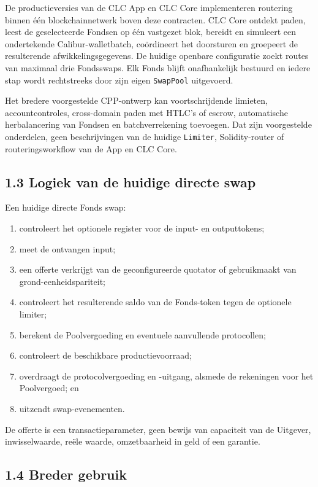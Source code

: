 \documentclass[11pt]{article}
\begin{document}
De productieversies van de CLC App en CLC Core implementeren routering binnen één blockchainnetwerk boven deze contracten. CLC Core ontdekt paden, leest de geselecteerde Fondsen op één vastgezet blok, bereidt en simuleert een ondertekende Calibur-walletbatch, coördineert het doorsturen en groepeert de resulterende afwikkelingsgegevens. De huidige openbare configuratie zoekt routes van maximaal drie Fondsswaps. Elk Fonds blijft onafhankelijk bestuurd en iedere stap wordt rechtstreeks door zijn eigen \texttt{SwapPool} uitgevoerd.

Het bredere voorgestelde CPP-ontwerp kan voortschrijdende limieten, accountcontroles, cross-domain paden met HTLC's of escrow, automatische herbalancering van Fondsen en batchverrekening toevoegen. Dat zijn voorgestelde onderdelen, geen beschrijvingen van de huidige \texttt{Limiter}, Solidity-router of routeringsworkflow van de App en CLC Core.

\subsection*{1.3 Logiek van de huidige directe swap}

Een huidige directe Fonds swap:

\begin{enumerate}[leftmargin=*]
\item controleert het optionele register voor de input- en outputtokens;
\item meet de ontvangen input;
\item een offerte verkrijgt van de geconfigureerde quotator of gebruikmaakt van grond-eenheidspariteit;
\item controleert het resulterende saldo van de Fonds-token tegen de optionele limiter;
\item berekent de Poolvergoeding en eventuele aanvullende protocollen;
\item controleert de beschikbare productievoorraad;
\item overdraagt de protocolvergoeding en -uitgang, alsmede de rekeningen voor het Poolvergoed; en
\item uitzendt swap-evenementen.
\end{enumerate}
De offerte is een transactieparameter, geen bewijs van capaciteit van de Uitgever, inwisselwaarde, reële waarde, omzetbaarheid in geld of een garantie.

\subsection*{1.4 Breder gebruik}
\end{document}
